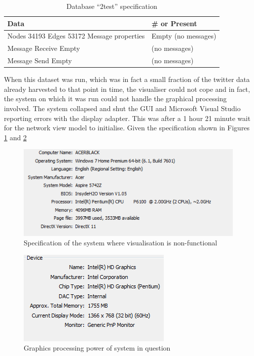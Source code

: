 \begin{table}%
\centering
\begin{tabular}{|l|l|}
\hline
Data & \# or Present \\
\hline
Nodes	34193
Edges	53172
Message properties & Empty (no messages) \\
Message Receive	Empty &(no messages) \\
Message Send	Empty & (no messages) \\
\hline
\end{tabular}
\caption{Database ``2test'' specification}
\label{tab:2test}
\end{table}

When this dataset was run, which was in fact a small fraction of the twitter data already harvested to that point in time, the visualiser could not cope and in fact, the system on which it was run could not handle the graphical processing involved. The system collapsed and shut the GUI and Microsoft Visual Studio reporting errors with the display adapter. This was after a 1 hour 21 minute wait for the network view model to initialise. Given the specification shown in Figures \ref{fig:hardwarespecs1} and \ref{fig:hardwarespecs2}

\begin{figure}[htbp]%
\centering
\includegraphics[width=0.5\columnwidth]{./img/hardwarespecs1}%
\caption{Specification of the system where visualisation is non-functional}%
\label{fig:hardwarespecs1}%
\end{figure}

\begin{figure}[htbp]%
\centering
\includegraphics[width=0.5\columnwidth]{./img/hardwarespecs2}%
\caption{Graphics processing power of system in question}%
\label{fig:hardwarespecs2}%
\end{figure}

